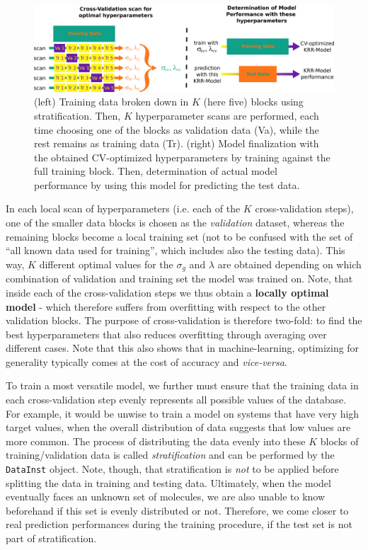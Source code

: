 \documentclass[12pt]{achemso}
\begin{document}
\begin{figure}
  \centering
   \includegraphics[width=16.5cm]{./resources/02_CV.png}
  \caption{(left) Training data broken down in $K$ (here five) blocks using stratification. Then, $K$ hyperparameter scans are performed, each time choosing one of the blocks as validation data (Va), while the rest remains as training data (Tr). (right) Model finalization with the obtained CV-optimized hyperparameters by training against the full training block. Then, determination of actual model performance by using this model for predicting the test data.}
  \label{FIG: 02_CV}
\end{figure}

\noindent In each local scan of hyperparameters (i.e. each of the $K$ cross-validation steps), one of the smaller data blocks is chosen as the \textit{validation} dataset, whereas the remaining blocks become a local training set (not to be confused with the set of ``all known data used for training'', which includes also the testing data). This way, $K$ different optimal values for the $\sigma_g$ and $\lambda$ are obtained depending on which combination of validation and training set the model was trained on. Note, that inside each of the cross-validation steps we thus obtain a \textbf{locally optimal model} - which therefore suffers from overfitting with respect to the other validation blocks. The purpose of cross-validation is therefore two-fold: to find the best hyperparameters that also reduces overfitting through averaging over different cases. Note that this also shows that in machine-learning, optimizing for generality typically comes at the cost of accuracy and \textit{vice-versa}.

\noindent To train a most versatile model, we further must ensure that the training data in each cross-validation step evenly represents all possible values of the database. For example, it would be unwise to train a model on systems that have very high target values, when the overall distribution of data suggests that low values are more common. The process of distributing the data evenly into these $K$ blocks of training/validation data is called \textit{stratification} and can be performed by the \texttt{DataInst} object. Note, though, that stratification is \textit{not} to be applied before splitting the data in training and testing data. Ultimately, when the model eventually faces an unknown set of molecules, we are also unable to know beforehand if this set is evenly distributed or not. Therefore, we come closer to real prediction performances during the training procedure, if the test set is not part of stratification.
\end{document}
